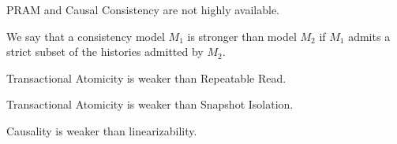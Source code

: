 \begin{corollary}
PRAM and Causal Consistency are not highly available.
\end{corollary}

\begin{definition}
\end{definition}

\begin{definition}
\end{definition}

\begin{definition}
\end{definition}

\begin{definition}
\end{definition}

\begin{definition}
\end{definition}

\begin{definition}
\end{definition}

\begin{definition}
\end{definition}

\begin{definition}
\end{definition}

\begin{definition}
\end{definition}

\begin{definition}
We say that a consistency model $M_1$ is stronger than model $M_2$ if
$M_1$ admits a strict subset of the histories admitted by $M_2$.
\end{definition}

\begin{observation}
Transactional Atomicity is weaker than Repeatable Read.
\end{observation}

\begin{observation}
Transactional Atomicity is weaker than Snapshot Isolation.
\end{observation}

\begin{observation}
Causality is weaker than linearizability.
\end{observation}

